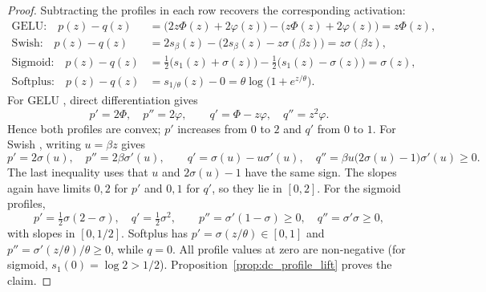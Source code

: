 \begin{proof}
Subtracting the profiles in each row recovers the corresponding activation:
\begin{align*}
\text{GELU:}\quad p(z)-q(z)
    &=\bigl(2z\Phi(z)+2\varphi(z)\bigr)-\bigl(z\Phi(z)+2\varphi(z)\bigr)=z\Phi(z),\\
\text{Swish:}\quad p(z)-q(z)
    &=2s_\beta(z)-\bigl(2s_\beta(z)-z\sigma(\beta z)\bigr)=z\sigma(\beta z),\\
\text{Sigmoid:}\quad p(z)-q(z)
    &=\tfrac12\bigl(s_1(z)+\sigma(z)\bigr)-\tfrac12\bigl(s_1(z)-\sigma(z)\bigr)=\sigma(z),\\
\text{Softplus:}\quad p(z)-q(z)
    &=s_{1/\theta}(z)-0=\theta\log\bigl(1+e^{z/\theta}\bigr).
\end{align*}
For GELU \parencite{Hendrycks2016}, direct differentiation gives
\begin{equation*}
    p'=2\Phi,\quad p''=2\varphi,\qquad
    q'=\Phi-z\varphi,\quad q''=z^2\varphi.
\end{equation*}
Hence both profiles are convex; $p'$ increases from $0$ to $2$ and $q'$ from $0$ to $1$. For Swish \parencite{Ramachandran2017_swish}, writing $u=\beta z$ gives
\begin{equation*}
    p'=2\sigma(u),\quad p''=2\beta\sigma'(u),\qquad
    q'=\sigma(u)-u\sigma'(u),\quad
    q''=\beta u\bigl(2\sigma(u)-1\bigr)\sigma'(u)\ge0.
\end{equation*}
The last inequality uses that $u$ and $2\sigma(u)-1$ have the same sign. The slopes again have limits $0,2$ for $p'$ and $0,1$ for $q'$, so they lie in $[0,2]$. For the sigmoid profiles,
\begin{equation*}
    p'=\tfrac12\sigma(2-\sigma),\quad
    q'=\tfrac12\sigma^2,\qquad
    p''=\sigma'(1-\sigma)\ge0,\quad q''=\sigma'\sigma\ge0,
\end{equation*}
with slopes in $[0,1/2]$. Softplus has $p'=\sigma(z/\theta)\in[0,1]$ and $p''=\sigma'(z/\theta)/\theta\ge0$, while $q=0$. All profile values at zero are non-negative (for sigmoid, $s_1(0)=\log2>1/2$). Proposition~\ref{prop:dc_profile_lift} proves the claim.
\end{proof}

